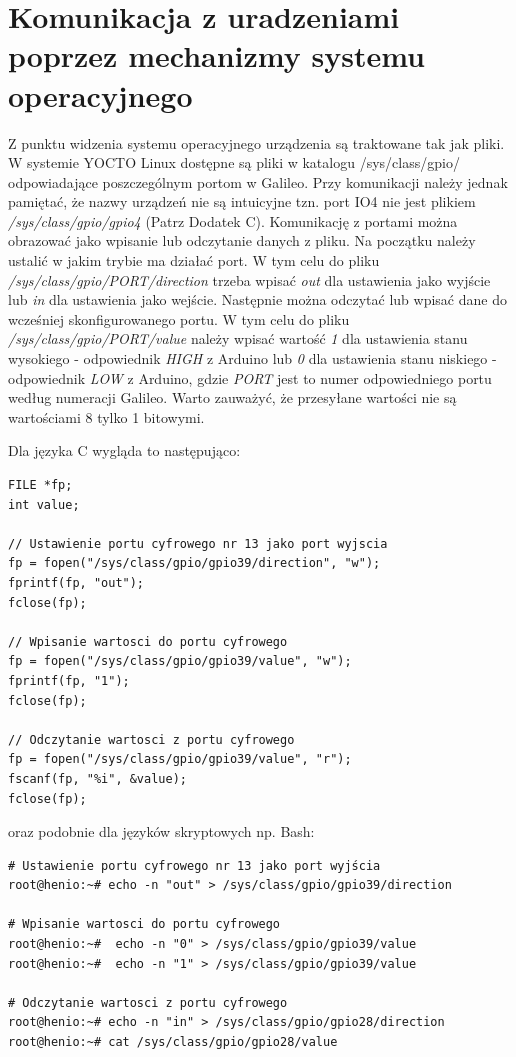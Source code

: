 \documentclass{xmgr}
\begin{document}
\section{Komunikacja z uradzeniami poprzez mechanizmy systemu operacyjnego}
Z punktu widzenia systemu operacyjnego urządzenia są traktowane tak jak pliki. W systemie YOCTO Linux dostępne są pliki w katalogu /sys/class/gpio/ odpowiadające poszczególnym portom w Galileo. Przy komunikacji należy jednak pamiętać, że nazwy urządzeń nie są intuicyjne tzn. port IO4 nie jest plikiem \emph{/sys/class/gpio/gpio4} (Patrz Dodatek C). Komunikację z portami można obrazować jako wpisanie lub odczytanie danych z pliku. Na początku należy ustalić w jakim trybie ma działać port. W tym celu do pliku \emph{/sys/class/gpio/PORT/direction} trzeba wpisać \emph{out} dla ustawienia jako wyjście lub \emph{in} dla ustawienia jako wejście. Następnie można odczytać lub wpisać dane do wcześniej skonfigurowanego portu. W tym celu do pliku \emph{/sys/class/gpio/PORT/value} należy wpisać wartość \emph{1} dla ustawienia stanu wysokiego - odpowiednik \emph{HIGH} z Arduino lub \emph{0} dla ustawienia stanu niskiego - odpowiednik \emph{LOW} z Arduino, gdzie \emph{PORT} jest to numer odpowiedniego portu według numeracji Galileo. Warto zauważyć, że przesyłane wartości nie są wartościami 8 tylko 1 bitowymi.

Dla języka C wygląda to następująco:
\begin{lstlisting}[label=bot-dirs-alg,caption=Obsługa portu cyfrowego w środowisku Linux (język C)]
FILE *fp;
int value;

// Ustawienie portu cyfrowego nr 13 jako port wyjscia
fp = fopen("/sys/class/gpio/gpio39/direction", "w");
fprintf(fp, "out");
fclose(fp);

// Wpisanie wartosci do portu cyfrowego
fp = fopen("/sys/class/gpio/gpio39/value", "w");
fprintf(fp, "1");
fclose(fp);

// Odczytanie wartosci z portu cyfrowego
fp = fopen("/sys/class/gpio/gpio39/value", "r");
fscanf(fp, "%i", &value);
fclose(fp);
\end{lstlisting}

oraz podobnie dla języków skryptowych np. Bash:

\begin{lstlisting}[label=bot-dirs-alg,caption=Obsługa portu cyfrowego w środowisku Linux (bash)]
# Ustawienie portu cyfrowego nr 13 jako port wyjścia
root@henio:~# echo -n "out" > /sys/class/gpio/gpio39/direction

# Wpisanie wartosci do portu cyfrowego
root@henio:~#  echo -n "0" > /sys/class/gpio/gpio39/value
root@henio:~#  echo -n "1" > /sys/class/gpio/gpio39/value

# Odczytanie wartosci z portu cyfrowego
root@henio:~# echo -n "in" > /sys/class/gpio/gpio28/direction
root@henio:~# cat /sys/class/gpio/gpio28/value
\end{lstlisting}
\end{document}
